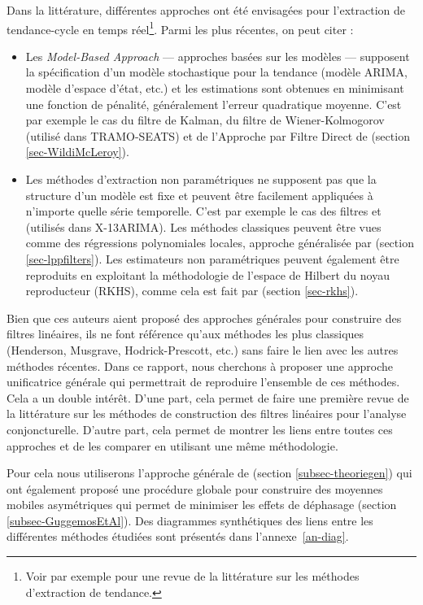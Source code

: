 \documentclass[
  11pt,
  french,
  a4paper]{article}
\newcommand\1{\mathds{1}}
\begin{document}
Dans la littérature, différentes approches ont été envisagées pour l'extraction de tendance-cycle en temps réel\footnote{Voir par exemple \textcite{alexandrov2012TEreview} pour une revue de la littérature sur les méthodes d'extraction de tendance.}.
Parmi les plus récentes, on peut citer :

\begin{itemize}
\item
  Les \emph{Model-Based Approach} --- approches basées sur les modèles --- supposent la spécification d'un modèle stochastique pour la tendance (modèle ARIMA, modèle d'espace d'état, etc.) et les estimations sont obtenues en minimisant une fonction de pénalité, généralement l'erreur quadratique moyenne.
  C'est par exemple le cas du filtre de Kalman, du filtre de Wiener-Kolmogorov (utilisé dans TRAMO-SEATS) et de l'Approche par Filtre Direct de \textcite{trilemmaWMR2019} (section \ref{sec-WildiMcLeroy}).
\item
  Les méthodes d'extraction non paramétriques ne supposent pas que la structure d'un modèle est fixe et peuvent être facilement appliquées à n'importe quelle série temporelle.
  C'est par exemple le cas des filtres \textcite{henderson1916note} et \textcite{musgrave1964set} (utilisés dans X-13ARIMA).
  Les méthodes classiques peuvent être vues comme des régressions polynomiales locales, approche généralisée par \textcite{proietti2008} (section \ref{sec-lppfilters}).
  Les estimateurs non paramétriques peuvent également être reproduits en exploitant la méthodologie de l'espace de Hilbert du noyau reproducteur (RKHS), comme cela est fait par
  \textcite{dagumbianconcini2008} (section \ref{sec-rkhs}).
\end{itemize}

Bien que ces auteurs aient proposé des approches générales pour construire des filtres linéaires, ils ne font référence qu'aux méthodes les plus classiques (Henderson, Musgrave, Hodrick-Prescott, etc.) sans faire le lien avec les autres méthodes récentes.
Dans ce rapport, nous cherchons à proposer une approche unificatrice générale qui permettrait de reproduire l'ensemble de ces méthodes.
Cela a un double intérêt.
D'une part, cela permet de faire une première revue de la littérature sur les méthodes de construction des filtres linéaires pour l'analyse conjoncturelle.
D'autre part, cela permet de montrer les liens entre toutes ces approches et de les comparer en utilisant une même méthodologie.

Pour cela nous utiliserons l'approche générale de \textcite{ch15HBSA} (section \ref{subsec-theoriegen}) qui ont également proposé une procédure globale pour construire des moyennes mobiles asymétriques qui permet de minimiser les effets de déphasage (section \ref{subsec-GuggemosEtAl}).
Des diagrammes synthétiques des liens entre les différentes méthodes étudiées sont présentés dans l'annexe~\ref{an-diag}.
\end{document}

